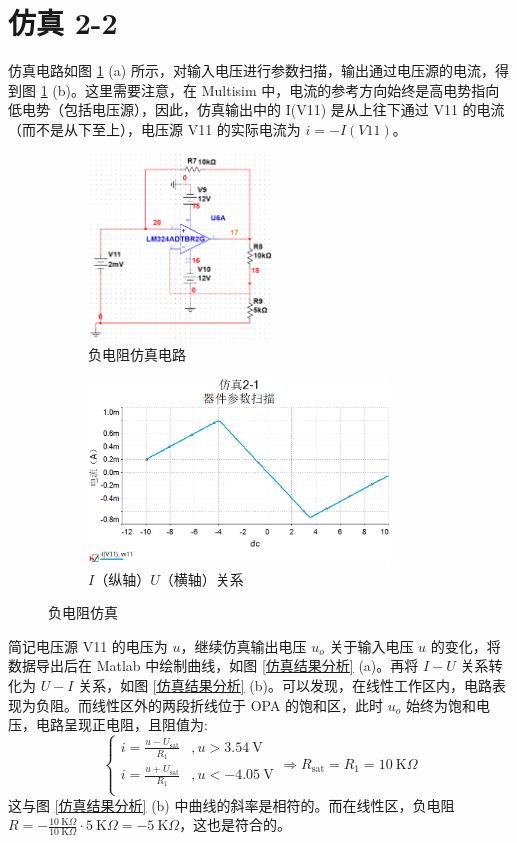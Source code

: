\documentclass[UTF8]{report}
\def\KO{\ \mathrm{K}\Omega}
\theoremstyle{MyLineTheoremStyle} %
\theoremstyle{MyBlockTheoremStyle} %
\theoremstyle{MySubsubsectionStyle} %
\begin{document}
\section{仿真 2-2}

仿真电路如图 \ref{负电阻仿真} (a) 所示，对输入电压进行参数扫描，输出通过电压源的电流，得到图 \ref{负电阻仿真} (b)。这里需要注意，在 Multisim 中，电流的参考方向始终是高电势指向低电势（包括电压源），因此，仿真输出中的 I(V11) 是从上往下通过 V11 的电流（而不是从下至上），电压源 V11 的实际电流为 $i = -I(V11)$。

\begin{figure}[H]\centering
\begin{subfigure}[t]{0.47\textwidth}\centering
    \includegraphics[height=140pt]{assets/3/0649949f48a11f77b47f406012e3f7a8.png}
    \caption{ 负电阻仿真电路 }
\end{subfigure}\begin{subfigure}[t]{0.5\textwidth}\centering
    \includegraphics[height=140pt]{assets/3/83d7126e6d74b406acb4bbc94900f2c6.png}
    \caption{ $I$（纵轴）$U$（横轴）关系 }
\end{subfigure}
\caption{ 负电阻仿真 }\label{负电阻仿真}
\end{figure}

简记电压源 V11 的电压为 $u$，继续仿真输出电压 $u_o$ 关于输入电压 $u$ 的变化，将数据导出后在 Matlab 中绘制曲线，如图 \ref{仿真结果分析} (a)。再将 $I-U$ 关系转化为 $U-I$ 关系，如图 \ref{仿真结果分析} (b)。可以发现，在线性工作区内，电路表现为负阻。而线性区外的两段折线位于 OPA 的饱和区，此时 $u_o$ 始终为饱和电压，电路呈现正电阻，且阻值为:
\begin{equation}
\begin{cases}
    i = \frac{u - U_{\text{sat}}}{R_1} &, u > 3.54\ \mathrm{V} \\ 
    i = \frac{u + U_{\text{sat}}}{R_1} &, u < -4.05 \ \mathrm{V} \\ 
\end{cases}\Longrightarrow 
R_{\text{sat}} = R_1 = 10 \KO
\end{equation}
这与图 \ref{仿真结果分析} (b) 中曲线的斜率是相符的。而在线性区，负电阻 $R = -\frac{10 \KO}{10 \KO} \cdot 5 \KO = - 5 \KO$，这也是符合的。
\end{document}
